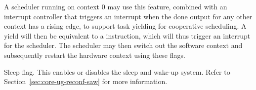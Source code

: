 A scheduler running on context 0 may use this feature, combined with an
interrupt controller that triggers an interrupt when the done output for any
other context has a rising edge, to support task yielding for cooperative
scheduling. A yield will then be equivalent to a  instruction, which
will thus trigger an interrupt for the scheduler. The scheduler may then
switch out the software context and subsequently restart the hardware context
using these flags.

\implementation{}

Sleep flag. This enables or disables the sleep and wake-up system. Refer to
Section~\ref{sec:core-ug-reconf-saw} for more information.

\implementation{}

